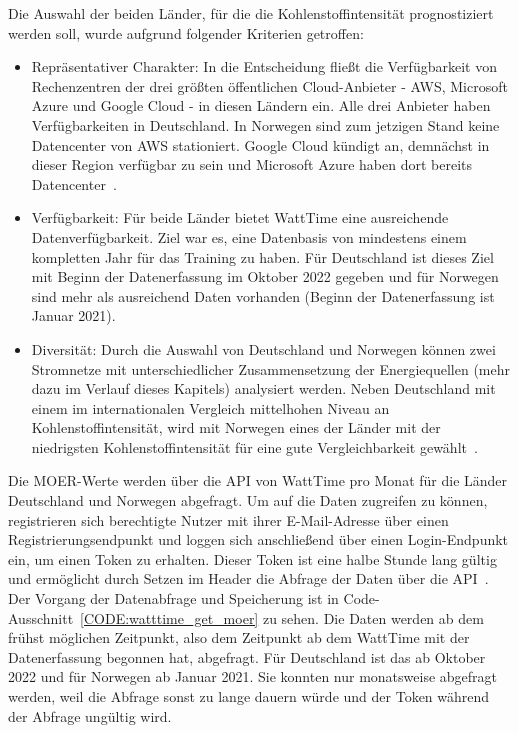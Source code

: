 Die Auswahl der beiden Länder, für die die Kohlenstoffintensität prognostiziert werden soll, wurde aufgrund folgender Kriterien getroffen:
\begin{itemize}
 \item Repräsentativer Charakter: In die Entscheidung fließt die Verfügbarkeit von Rechenzentren der drei größten öffentlichen Cloud-Anbieter - \ac{AWS}, Microsoft Azure und Google Cloud - in diesen Ländern ein.
 Alle drei Anbieter haben Verfügbarkeiten in Deutschland.
 In Norwegen sind zum jetzigen Stand keine Datencenter von \ac{AWS} stationiert.
 Google Cloud kündigt an, demnächst in dieser Region verfügbar zu sein und Microsoft Azure haben dort bereits Datencenter~\cite{AmazonWebServices.20240318T18:30:19.000Z}\cite{GoogleCloud.20240311T07:04:17.000Z}\cite{Microsoft.20240307T01:34:37.000Z}.
 \item Verfügbarkeit: Für beide Länder bietet WattTime eine ausreichende Datenverfügbarkeit.
 Ziel war es, eine Datenbasis von mindestens einem kompletten Jahr für das Training zu haben.
 Für Deutschland ist dieses Ziel mit Beginn der Datenerfassung im Oktober 2022 gegeben und für Norwegen sind mehr als ausreichend Daten vorhanden (Beginn der Datenerfassung ist Januar 2021).
 \item Diversität: Durch die Auswahl von Deutschland und Norwegen können zwei Stromnetze mit unterschiedlicher Zusammensetzung der Energiequellen (mehr dazu im Verlauf dieses Kapitels) analysiert werden.
 Neben Deutschland mit einem im internationalen Vergleich mittelhohen Niveau an Kohlenstoffintensität, wird mit Norwegen eines der Länder mit der niedrigsten Kohlenstoffintensität für eine gute Vergleichbarkeit gewählt~\cite{ElectricityMaps.20240305T20:54:29.000Z}.
\end{itemize}
Die \ac{MOER}-Werte werden über die \ac{API} von WattTime pro Monat für die Länder Deutschland und Norwegen abgefragt.
Um auf die Daten zugreifen zu können, registrieren sich berechtigte Nutzer mit ihrer E-Mail-Adresse über einen Registrierungsendpunkt und loggen sich anschließend über einen Login-Endpunkt ein, um einen Token zu erhalten.
Dieser Token ist eine halbe Stunde lang gültig und ermöglicht durch Setzen im Header die Abfrage der Daten über die \ac{API}~\cite{.20240220T17:59:19.000Z}.
Der Vorgang der Datenabfrage und Speicherung ist in Code-Ausschnitt~\ref{CODE:watttime_get_moer} zu sehen.
Die Daten werden ab dem frühst möglichen Zeitpunkt, also dem Zeitpunkt ab dem WattTime mit der Datenerfassung begonnen hat, abgefragt.
Für Deutschland ist das ab Oktober 2022 und für Norwegen ab Januar 2021.
Sie konnten nur monatsweise abgefragt werden, weil die Abfrage sonst zu lange dauern würde und der Token während der Abfrage ungültig wird.

